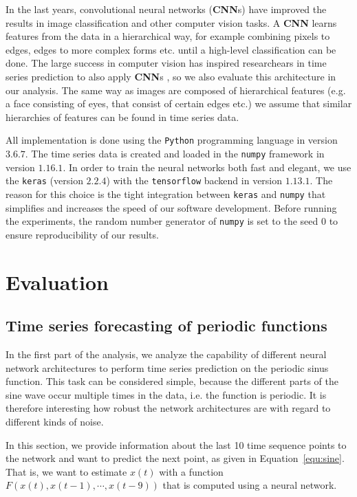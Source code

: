 \documentclass{article}
\begin{document}
In the last years, convolutional neural networks (\textbf{CNN}s) have improved
the results in image classification \cite{krizhevsky2012} and other computer
vision tasks. A \textbf{CNN} learns features from the data in a hierarchical
way, for example combining pixels to edges, edges to more complex forms etc.
until a high-level classification can be done. The large success in computer
vision has inspired researchears in time series prediction to also apply
\textbf{CNN}s \cite{cui2016, borovykh2017}, so we also evaluate this
architecture in our analysis. The same way as images are composed of
hierarchical features (e.g. a face consisting of eyes, that consist of
certain edges etc.) we assume that similar hierarchies of features can be found
in time series data.

All implementation is done using the \texttt{Python} programming language in
version $3.6.7$. The time series data is created and loaded in the
\texttt{numpy} framework in version $1.16.1$. In order to train the neural
networks both fast and elegant, we use the \texttt{keras} (version $2.2.4$)
with the
\texttt{tensorflow} backend in version $1.13.1$.
The reason for this choice is the tight
integration between \texttt{keras} and \texttt{numpy} that simplifies and
increases the speed of our software development. Before running the experiments,
the random number generator of \texttt{numpy} is set to the seed $0$ to ensure
reproducibility of our results.

\section{Evaluation}
\subsection{Time series forecasting of periodic functions}
\label{sec:sine}
In the first part of the analysis, we analyze the capability of different neural
network architectures to perform time series prediction on the periodic sinus
function. This task can be considered simple, because the different parts of the
sine wave occur multiple times in the data, i.e. the function is periodic.
It is therefore interesting how
robust the network architectures are with regard to different kinds of noise.

In this section, we provide information about the last 10 time sequence points
to the network and want to predict the next point, as given in
Equation~\ref{equ:sine}. That is, we want to estimate $x(t)$ with a function
$F(x(t), x(t-1), \cdots, x(t-9))$ that is computed using a neural network.
\end{document}
